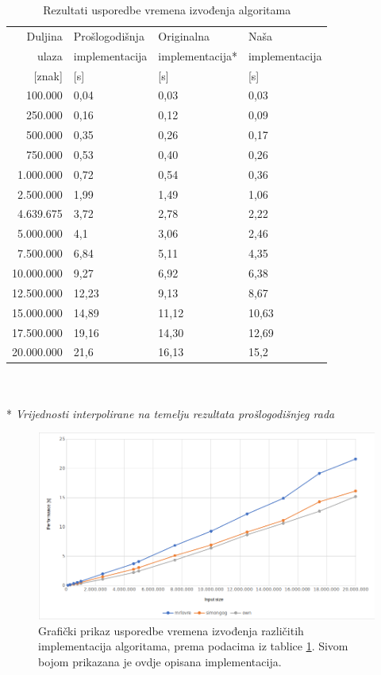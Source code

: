 \documentclass[a4paper,12pt]{article}
\begin{document}
\begin{table}[h!]
	\caption{Rezultati usporedbe vremena izvođenja algoritama}
	\label{tableTimeComp}
	\begin{center}
		\begin{tabular}{rlll}
			\toprule
			Duljina & Prošlogodišnja & Originalna & Naša \\
			ulaza & implementacija & implementacija* & implementacija \\
			{[znak]} & [s] & [s] & [s] \\
			\midrule
			100.000	   	& 	0,04 	&	0,03		&	0,03 \\
			250.000		& 	0,16	&	0,12		&	0,09 \\
			500.000		& 	0,35	&	0,26		&	0,17 \\
			750.000		& 	0,53	&	0,40		&	0,26 \\
			1.000.000	& 	0,72	&	0,54		&	0,36 \\
			2.500.000	& 	1,99	&	1,49		&	1,06 \\
			4.639.675	& 	3,72	&	2,78		&	2,22 \\
			5.000.000	& 	4,1		&	3,06		&	2,46 \\
			7.500.000	& 	6,84	&	5,11		&	4,35 \\
			10.000.000	& 	9,27	&	6,92		&	6,38 \\
			12.500.000	& 	12,23	&	9,13		&	8,67 \\
			15.000.000	& 	14,89	&	11,12		&	10,63 \\
			17.500.000	& 	19,16	&	14,30		&	12,69 \\
			20.000.000	& 	21,6	&	16,13		&	15,2 \\
			\bottomrule
		\end{tabular}\\ ~ \\
		* \textit{Vrijednosti interpolirane na temelju rezultata prošlogodišnjeg rada}
	\end{center}
\end{table}

\begin{figure}[h!]
	\begin{center}
		\includegraphics[width=\columnwidth]{timeGraph.png}
 		\caption{Grafički prikaz usporedbe vremena izvođenja različitih implementacija algoritama, prema podacima iz tablice \ref{tableTimeComp}. Sivom bojom prikazana je ovdje opisana implementacija.}
 		\label{fig:graphTime}
	\end{center}
\end{figure}
\end{document}
